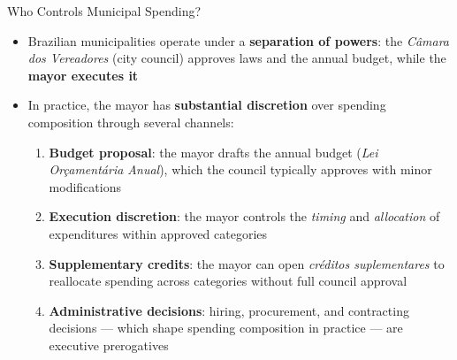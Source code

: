 \documentclass{beamer}
\begin{document}
\begin{frame}{Who Controls Municipal Spending?}
\begin{itemize}
    \item Brazilian municipalities operate under a \textbf{separation of powers}: the \textit{Câmara dos Vereadores} (city council) approves laws and the annual budget, while the \textbf{mayor executes it}
    \vspace{0.5em}
    \item In practice, the mayor has \textbf{substantial discretion} over spending composition through several channels:
    \vspace{0.5em}
    \begin{enumerate}
        \item \textbf{Budget proposal}: the mayor drafts the annual budget (\textit{Lei Orçamentária Anual}), which the council typically approves with minor modifications
        \vspace{0.3em}
        \item \textbf{Execution discretion}: the mayor controls the \textit{timing} and \textit{allocation} of expenditures within approved categories
        \vspace{0.3em}
        \item \textbf{Supplementary credits}: the mayor can open \textit{créditos suplementares} to reallocate spending across categories without full council approval
        \vspace{0.3em}
        \item \textbf{Administrative decisions}: hiring, procurement, and contracting decisions --- which shape spending composition in practice --- are executive prerogatives
    \end{enumerate}
\end{itemize}
\end{frame}
\end{document}

